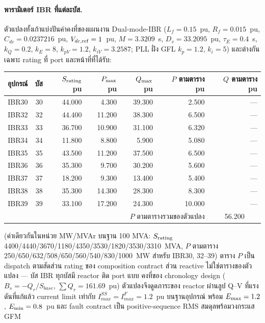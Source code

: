 \documentclass[12pt,a4paper]{article}
\begin{document}
\paragraph{พารามิเตอร์ IBR ที่แต่ละบัส.} ตัวแปลงทั้งเก้าแบ่งปันค่าคงที่ของแผนงาน
Dual-mode-IBR ($L_f=0.15$~pu, $R_f=0.015$~pu, $C_{dc}=0.0237216$~pu,
$V_{dc,\rm ref}=1$~pu, $M=3.3209$~s, $D_v=33.2095$~pu, $\tau_E=0.4$~s,
$k_Q=0.2$, $k_E=8$, $k_{pV}=1.2$, $k_{iV}=3.2587$; PLL ฝั่ง GFL $k_p=1.2$, $k_i=5$)
และต่างกันเฉพาะ rating ที่ port และหน้าที่ที่ได้รับ:
\begin{center}\footnotesize
\begin{tabular}{crrrrrr}
\toprule
อุปกรณ์ & บัส & $S_{\rm rating}$ pu & $P_{\rm max}$ pu & $Q_{\rm max}$ pu & $P$ ตามตาราง pu & $Q$ ตามตาราง pu\\
\midrule
IBR30 & 30 & 44.000 & 4.300  & 39.300 & 2.500  & ---\\
IBR32 & 32 & 44.400 & 11.200 & 38.300 & 6.500  & ---\\
IBR33 & 33 & 36.700 & 10.900 & 31.100 & 6.320  & ---\\
IBR34 & 34 & 11.800 & 8.800  & 5.900  & 5.080  & ---\\
IBR35 & 35 & 43.500 & 11.200 & 37.500 & 6.500  & ---\\
IBR36 & 36 & 35.300 & 9.700  & 30.200 & 5.600  & ---\\
IBR37 & 37 & 18.200 & 9.300  & 13.400 & 5.400  & ---\\
IBR38 & 38 & 35.300 & 14.300 & 28.300 & 8.300  & ---\\
IBR39 & 39 & 33.100 & 17.200 & 24.300 & 10.000 & ---\\
\midrule
\multicolumn{6}{r}{$P$ ตามตารางรวมของตัวแปลง} & \multicolumn{1}{c}{56.200}\\
\bottomrule
\end{tabular}
\end{center}
(ค่าเดียวกันในหน่วย MW/MVAr บนฐาน 100 MVA: $S_{\rm rating}$
4400/4440/3670/1180/4350/3530/1820/3530/3310~MVA, $P$ ตามตาราง
250/650/632/508/650/560/540/830/1000~MW สำหรับ IBR30, 32--39)
ตาราง $P$ เป็น dispatch ตามสัดส่วน rating ของ composition contract
ส่วน reactive ไม่ใช่ตารางของตัวแปลง --- บัส IBR ทุกบัสมี reactor ติด port แบบ
คงที่ของ chronology design ($B_s=-Q_r/S_{base}$, $\sum Q_r=161.69$~pu)
ตัวแปลงจึงดูดภาระของ reactor ผ่านลูป Q--V ที่แรงดันที่แก้แล้ว
current limit เท่ากับ $I_{max}^{SS}=I_{max}^{F}=1.2$~pu บนฐานอุปกรณ์
พร้อม $E_{\rm max}=1.2$, $E_{\rm min}=0.8$~pu และ fault contract เป็น
positive-sequence RMS สมดุลพร้อมวงกระแส GFM
\end{document}
